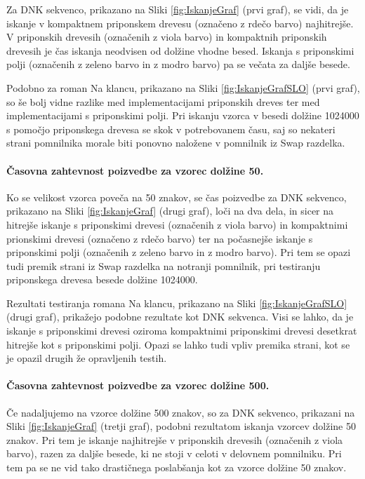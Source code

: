 Za DNK sekvenco, prikazano na Sliki \ref{fig:IskanjeGraf} (prvi graf), se vidi, da je iskanje v kompaktnem priponskem drevesu (označeno z rdečo barvo) najhitrejše. V priponskih drevesih (označenih z viola barvo) in kompaktnih priponskih drevesih je čas iskanja neodvisen od dolžine vhodne besed. Iskanja s priponskimi polji (označenih z zeleno barvo in z modro barvo) pa se večata za daljše besede.

Podobno za roman Na klancu, prikazano na Sliki \ref{fig:IskanjeGrafSLO} (prvi graf), so še bolj vidne razlike med implementacijami priponskih dreves ter med implementacijami s priponskimi polji. Pri iskanju vzorca v besedi dolžine 1024000 s pomočjo priponskega drevesa se skok v potrebovanem času, saj so nekateri strani pomnilnika morale biti ponovno naložene v pomnilnik iz Swap razdelka.

\paragraph{Časovna zahtevnost poizvedbe za vzorec dolžine 50.}

Ko se velikost vzorca poveča na 50 znakov, se čas poizvedbe za DNK sekvenco, prikazano na Sliki \ref{fig:IskanjeGraf} (drugi graf), loči na dva dela, in sicer na hitrejše iskanje s priponskimi drevesi (označenih z viola barvo) in kompaktnimi prionskimi drevesi (označeno z rdečo barvo) ter na počasnejše iskanje s priponskimi polji (označenih z zeleno barvo in z modro barvo). Pri tem se opazi tudi premik strani iz Swap razdelka na notranji pomnilnik, pri testiranju priponskega drevesa besede dolžine 1024000.

Rezultati testiranja romana Na klancu, prikazano na Sliki \ref{fig:IskanjeGrafSLO} (drugi graf), prikažejo podobne rezultate kot DNK sekvenca. Visi se lahko, da je iskanje s priponskimi drevesi oziroma kompaktnimi priponskimi drevesi desetkrat hitrejše kot s priponskimi polji. Opazi se lahko tudi vpliv premika strani, kot se je opazil drugih že opravljenih testih. 

\paragraph{Časovna zahtevnost poizvedbe za vzorec dolžine 500.}

Če nadaljujemo na vzorce dolžine 500 znakov, so za DNK sekvenco, prikazani na Sliki \ref{fig:IskanjeGraf} (tretji graf), podobni rezultatom iskanja vzorcev dolžine 50 znakov. Pri tem je iskanje najhitrejše v priponskih drevesih (označenih z viola barvo), razen za daljše besede, ki ne stoji v celoti v delovnem pomnilniku. Pri tem pa se ne vid tako drastičnega poslabšanja kot za vzorce dolžine 50 znakov.

